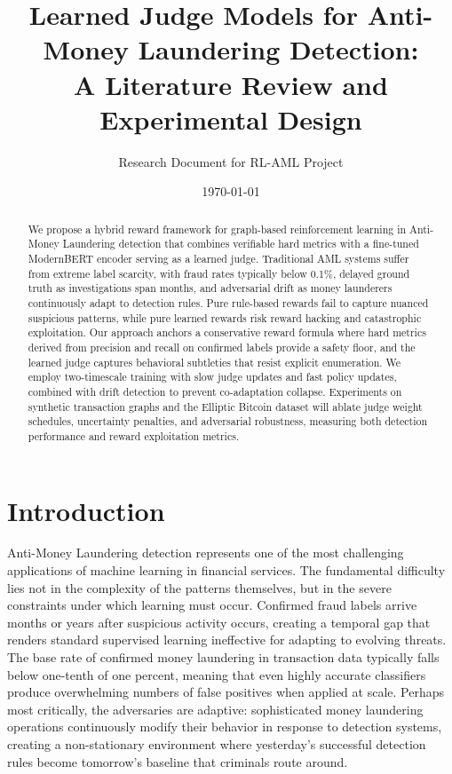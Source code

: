 \documentclass[11pt,a4paper]{article}
\title{Learned Judge Models for Anti-Money Laundering Detection:\\A Literature Review and Experimental Design}
\author{Research Document for RL-AML Project}
\date{\today}
\begin{document}
\maketitle

\begin{abstract}
We propose a hybrid reward framework for graph-based reinforcement learning in Anti-Money Laundering detection that combines verifiable hard metrics with a fine-tuned ModernBERT encoder serving as a learned judge. Traditional AML systems suffer from extreme label scarcity, with fraud rates typically below 0.1\%, delayed ground truth as investigations span months, and adversarial drift as money launderers continuously adapt to detection rules. Pure rule-based rewards fail to capture nuanced suspicious patterns, while pure learned rewards risk reward hacking and catastrophic exploitation. Our approach anchors a conservative reward formula where hard metrics derived from precision and recall on confirmed labels provide a safety floor, and the learned judge captures behavioral subtleties that resist explicit enumeration. We employ two-timescale training with slow judge updates and fast policy updates, combined with drift detection to prevent co-adaptation collapse. Experiments on synthetic transaction graphs and the Elliptic Bitcoin dataset will ablate judge weight schedules, uncertainty penalties, and adversarial robustness, measuring both detection performance and reward exploitation metrics.
\end{abstract}

\section{Introduction}

Anti-Money Laundering detection represents one of the most challenging applications of machine learning in financial services. The fundamental difficulty lies not in the complexity of the patterns themselves, but in the severe constraints under which learning must occur. Confirmed fraud labels arrive months or years after suspicious activity occurs, creating a temporal gap that renders standard supervised learning ineffective for adapting to evolving threats. The base rate of confirmed money laundering in transaction data typically falls below one-tenth of one percent, meaning that even highly accurate classifiers produce overwhelming numbers of false positives when applied at scale. Perhaps most critically, the adversaries are adaptive: sophisticated money laundering operations continuously modify their behavior in response to detection systems, creating a non-stationary environment where yesterday's successful detection rules become tomorrow's baseline that criminals route around.
\end{document}
